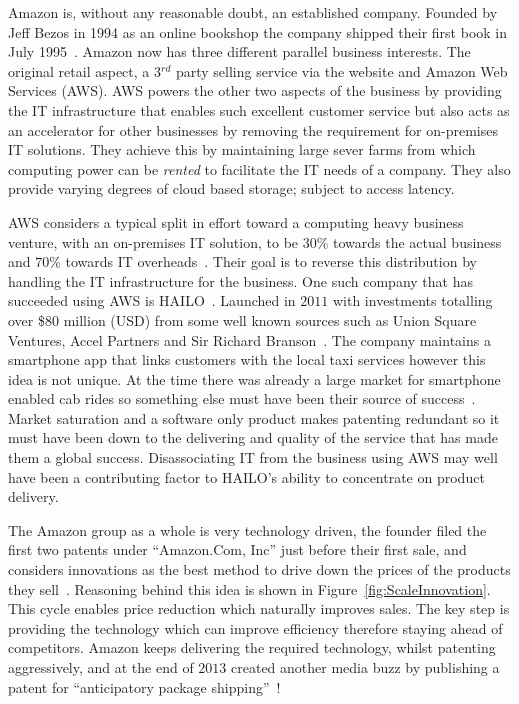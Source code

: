 
{}






Amazon is, without any reasonable doubt, an established company. 
Founded by Jeff Bezos in 1994 as an online bookshop the company shipped their first book in July 1995~\cite{seattle}. 
Amazon now has three different parallel business interests. 
The original retail aspect, a 3$^{rd}$ party selling service via the website and Amazon Web Services (AWS).
AWS powers the other two aspects of the business by providing the IT infrastructure that enables such excellent customer service but also acts as an accelerator for other businesses by removing the requirement for on-premises IT solutions. 
They achieve this by maintaining large sever farms from which computing power can be \emph{rented} to facilitate the IT needs of a company. 
They also provide varying degrees of cloud based storage; subject to access latency.

AWS considers a typical split in effort toward a computing heavy business venture, with an on-premises IT solution, to be $30\%$ towards the actual business and $70\%$ towards IT overheads~\cite{gavin2014ams}. 
Their goal is to reverse this distribution by handling the IT infrastructure for the business. 
One such company that has succeeded using AWS is HAILO~\cite{gavin2014ams}. 
Launched in $2011$ with investments totalling over \$$80$ million (USD) from some well known sources such as Union Square Ventures, Accel Partners and Sir Richard Branson~\cite{hailo}.
The company maintains a smartphone app that links customers with the local taxi services however this idea is not unique. 
At the time there was already a large market for smartphone enabled cab rides so something else must have been their source of success~\cite{ventureBeat}. 
Market saturation and a software only product makes patenting redundant so it must have been down to the delivering and quality of the service that has made them a global success. 
Disassociating IT from the business using AWS may well have been a contributing factor to HAILO's ability to concentrate on product delivery.


The Amazon group as a whole is very technology driven, the founder filed the first two patents under ``Amazon.Com, Inc'' just before their first sale, and considers innovations as the best method to drive down the prices of the products they sell~\cite{bezos1998secure1,bezos1998secure2}. 
Reasoning behind this idea is shown in Figure~\ref{fig:ScaleInnovation}.
This cycle enables price reduction which naturally improves sales. 
The key step is providing the technology which can improve efficiency therefore staying ahead of competitors. 
Amazon keeps delivering the required technology, whilst patenting aggressively, and at the end of $2013$ created another media buzz by publishing a patent for ``anticipatory package shipping''~\cite{spiegel2013method}!



